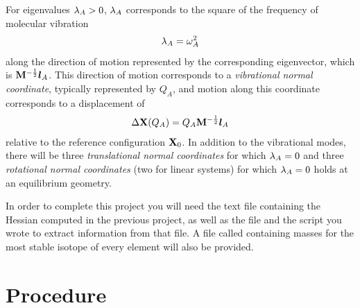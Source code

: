 \documentclass[11pt]{article}
\begin{document}
For eigenvalues $\lambda_A>0$, $\lambda_A$ corresponds to the square of the frequency of molecular vibration
\begin{align}
	\lambda_A = \omega_A^2
\end{align}
along the direction of motion represented by the corresponding eigenvector, which is $\mathbf{M}^{-\frac{1}{2}}\bm{l}_A$.
This direction of motion corresponds to a {\it vibrational normal coordinate}, typically represented by $Q_A$, and motion along this coordinate corresponds to a displacement of
\begin{align}
%
	\D\bo{X}(Q_A)
=
	Q_A\bo{M}^{-\frac{1}{2}}\bm{l}_A
\end{align}
relative to the reference configuration $\mathbf{X}_0$.
In addition to the vibrational modes, there will be three {\it translational normal coordinates} for which $\lambda_A=0$ and three {\it rotational normal coordinates} (two for linear systems) for which $\lambda_A=0$ holds at an equilibrium geometry.

In order to complete this project you will need the text file containing the Hessian computed in the previous project, as well as the file  and the script you wrote to extract information from that file.
A file called  containing masses for the most stable isotope of every element will also be provided.


\newpage
\section{Procedure}
\end{document}
